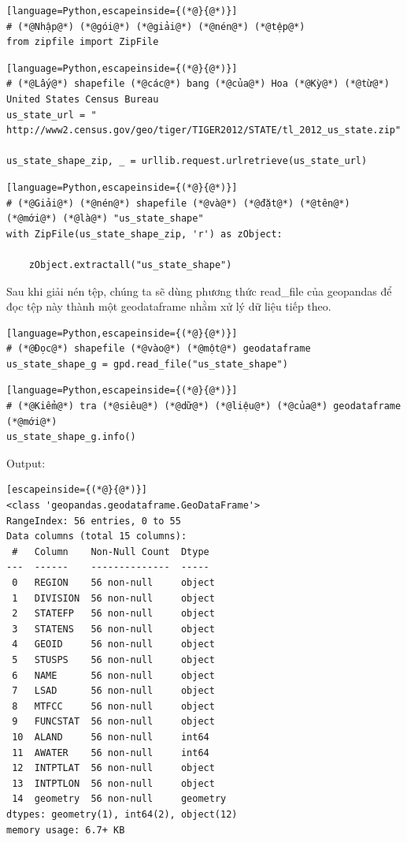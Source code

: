 \begin{lstlisting}[language=Python,escapeinside={(*@}{@*)}]
# (*@Nhập@*) (*@gói@*) (*@giải@*) (*@nén@*) (*@tệp@*)
from zipfile import ZipFile
\end{lstlisting}

\begin{lstlisting}[language=Python,escapeinside={(*@}{@*)}]
# (*@Lấy@*) shapefile (*@các@*) bang (*@của@*) Hoa (*@Kỳ@*) (*@từ@*) United States Census Bureau
us_state_url = "	http://www2.census.gov/geo/tiger/TIGER2012/STATE/tl_2012_us_state.zip"

us_state_shape_zip, _ = urllib.request.urlretrieve(us_state_url)
\end{lstlisting}

\begin{lstlisting}[language=Python,escapeinside={(*@}{@*)}]
# (*@Giải@*) (*@nén@*) shapefile (*@và@*) (*@đặt@*) (*@tên@*) (*@mới@*) (*@là@*) "us_state_shape"
with ZipFile(us_state_shape_zip, 'r') as zObject:

    zObject.extractall("us_state_shape")
\end{lstlisting}

Sau khi giải nén tệp, chúng ta sẽ dùng phương thức read\_file của geopandas để đọc tệp này thành một geodataframe nhằm xử lý dữ liệu tiếp theo.

\begin{lstlisting}[language=Python,escapeinside={(*@}{@*)}]
# (*@Đọc@*) shapefile (*@vào@*) (*@một@*) geodataframe
us_state_shape_g = gpd.read_file("us_state_shape")
\end{lstlisting}

\begin{lstlisting}[language=Python,escapeinside={(*@}{@*)}]
# (*@Kiểm@*) tra (*@siêu@*) (*@dữ@*) (*@liệu@*) (*@của@*) geodataframe (*@mới@*)
us_state_shape_g.info()
\end{lstlisting}

Output:

\begin{lstlisting}[escapeinside={(*@}{@*)}]
<class 'geopandas.geodataframe.GeoDataFrame'>
RangeIndex: 56 entries, 0 to 55
Data columns (total 15 columns):
 #   Column    Non-Null Count  Dtype   
---  ------    --------------  -----   
 0   REGION    56 non-null     object  
 1   DIVISION  56 non-null     object  
 2   STATEFP   56 non-null     object  
 3   STATENS   56 non-null     object  
 4   GEOID     56 non-null     object  
 5   STUSPS    56 non-null     object  
 6   NAME      56 non-null     object  
 7   LSAD      56 non-null     object  
 8   MTFCC     56 non-null     object  
 9   FUNCSTAT  56 non-null     object  
 10  ALAND     56 non-null     int64   
 11  AWATER    56 non-null     int64   
 12  INTPTLAT  56 non-null     object  
 13  INTPTLON  56 non-null     object  
 14  geometry  56 non-null     geometry
dtypes: geometry(1), int64(2), object(12)
memory usage: 6.7+ KB
\end{lstlisting}

